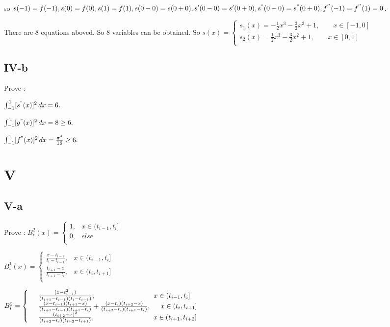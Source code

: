 \documentclass[a4paper]{article}
\begin{document}
so $s(-1) = f(-1), s(0) = f(0), s(1) = f(1), s(0-0) = s(0+0), s'(0-0) = s'(0+0), s^{"}(0-0) = s^{"}(0+0), 
f^{''}(-1) = f^{''}(1) = 0$.

There are 8 equations aboved. So 8 variables can be obtained.
So $s(x) = 
\left\{
\begin{array}{rl}
s_{1}(x) = -\frac{1}{2}x^{3} - \frac{3}{2}x^{2} + 1 , \qquad x \in [-1,0]\\
s_{2}(x) = \frac{1}{2}x^{3} - \frac{3}{2}x^{2} + 1 , \qquad x \in [0,1]\\
\end{array}
\right.
$

\subsection*{IV-b}
Prove :

    $\int_{-1}^{1} [s^{"}(x)]^{2} \,dx = 6.$

    $\int_{-1}^{1} [g^{"}(x)]^{2} \,dx = 8 \geq 6. $

    $\int_{-1}^{1} [f^{"}(x)]^{2} \,dx = \frac{\pi^{4}}{16} \geq 6.$



\section*{V}

\subsection*{V-a}
Prove :
$ B_{i}^{2}(x) = 
\left\{
    \begin{array}{rl}
    1 ,& x \in (t_{i-1}, t_{i}] \\
    0 ,& else \\
    \end{array}
\right.
$

$B_{i}^{1}(x) =
\left\{
    \begin{array}{rl}
        \frac{x-t_{i-1}}{t_{i}-t_{i-1}} ,& x \in (t_{i-1}, t_{i}] \\
        \frac{t_{i+1}-x}{t_{i+1}-t_{i}} ,& x \in (t_{i}, t_{i+1}] \\
    \end{array}
\right.
$

$B_{i}^{2} =
\left\{
    \begin{array}{rl}
        & \frac{(x-t_{i-1}^{2})}{(t_{i+1}-t_{i-1})(t_{i}-t_{i-1})} , \hspace{3cm} x \in (t_{i-1}, t_{i}] \\
        & \frac{(x - t_{i-1})(t_{i+1} - x)}{(t_{i+1}-t_{i-1})(t_{i+1}-t_{i})} 
        + \frac{(x - t_{i})(t_{i+2} - x)}{(t_{i+2}-t_{i})(t_{i+1}-t_{i})} , \hspace{0.5cm} x \in (t_{i}, t_{i+1}] \\
        & \frac{(t_{i+2} - x)^{2}}{(t_{i+2}-t_{i})(t_{i+2}-t_{i+1})} , \hspace{3cm} x \in (t_{i+1}, t_{i+2}] \\
    \end{array}
\right.
$
\end{document}
